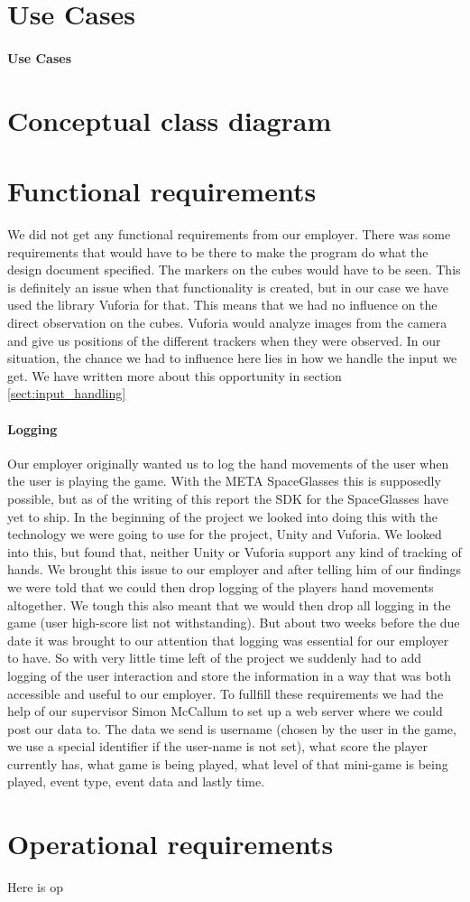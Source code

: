 \section{Use Cases}

\paragraph{Use Cases}

\section{Conceptual class diagram}

\section{Functional requirements}
We did not get any functional requirements from our employer. There was
some requirements that would have to be there to make the program do what the
design document specified. The markers on the cubes would have to be seen. This
is definitely an issue when that functionality is created, but in our case we
have used the library \gls{Vuforia} for that. This means that we had no
influence on the direct observation on the cubes. Vuforia would analyze images
from the camera and give us positions of the different trackers when they were
observed. In our situation, the chance we had to influence here lies in how we
handle the input we get. We have written more about this opportunity in section
\ref{sect:input_handling}

\paragraph{Logging}
Our employer originally wanted us to log the hand movements of the user when the user is playing the game. With the META SpaceGlasses this is supposedly possible, but as of the writing of this report the SDK for the SpaceGlasses have yet to ship. In the beginning of the project we looked into doing this with the technology we were going to use for the project, Unity and Vuforia. We looked into this, but found that, neither Unity or Vuforia support any kind of tracking of hands. We brought this issue to our employer and after telling him of our findings we were told that we could then drop logging of the players hand movements altogether.
We tough this also meant that we would then drop all logging in the game (user high-score list not withstanding). But about two weeks before the due date it was brought to our attention that logging was essential for our employer to have. So with very little time left of the project we suddenly had to add logging of the user interaction and store the information in a way that was both accessible and useful to our employer.
To fullfill these requirements we had the help of our supervisor Simon McCallum to set up a web server where we could post our data to.
The data we send is username (chosen by the user in the game, we use a special identifier if the user-name is not set), what score the player currently has, what game is being played, what level of that mini-game is being played, event type, event data and lastly time. 


\section{Operational requirements}
Here is op